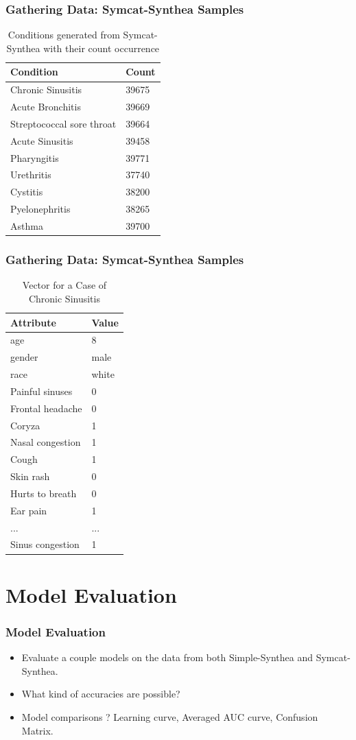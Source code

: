 \documentclass{beamer}
\begin{document}
\begin{frame}
\frametitle{Gathering Data: Symcat-Synthea Samples}
\begin{table}
\begin{tabular}{l l}
	\toprule
	\textbf{Condition} & \textbf{Count}\\
	\midrule
	Chronic Sinusitis & 39675 \\
	Acute Bronchitis & 39669 \\
	Streptococcal sore throat  & 39664 \\
	Acute  Sinusitis & 39458 \\
	Pharyngitis & 39771 \\
	Urethritis & 37740 \\
	Cystitis &  38200 \\
	Pyelonephritis &  38265 \\
	Asthma &  39700  \\
	\bottomrule
\end{tabular}
\caption{Conditions generated from Symcat-Synthea with their count occurrence }
\end{table}
\end{frame}

\begin{frame}
\frametitle{Gathering Data:  Symcat-Synthea Samples}
\begin{table}
\begin{tabular}{l l}
\toprule
\textbf{Attribute} & \textbf{Value}\\
\midrule
age&8\\
gender &male\\
race &white\\
Painful sinuses&0\\
Frontal headache&0\\
Coryza&1\\
Nasal congestion&1\\
Cough&1\\
Skin rash&0\\
Hurts to breath&0\\
Ear pain&1\\
... & ... \\
Sinus congestion&1\\
\bottomrule
\end{tabular}
\caption{Vector for a Case of Chronic Sinusitis}
\end{table}
\end{frame}

\section{Model Evaluation}
	\begin{frame}
	\frametitle{Model Evaluation}
	\begin{itemize}
		\item Evaluate a couple models on the data from both Simple-Synthea and Symcat-Synthea.
		\item What kind of accuracies are possible?
		\item Model comparisons ? Learning curve, Averaged AUC curve, Confusion Matrix.
	\end{itemize}
	\end{frame}
\end{document}
